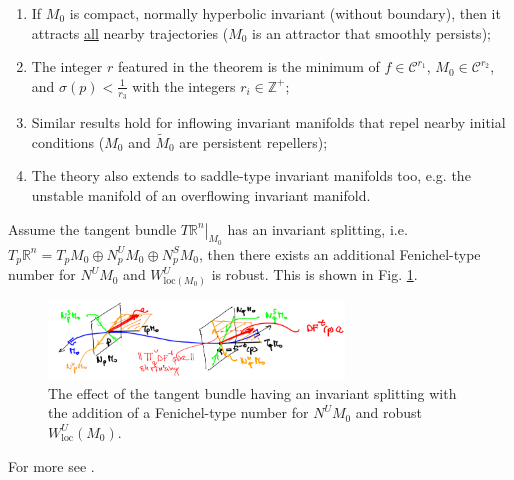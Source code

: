 \begin{remark}[]
	\begin{enumerate}
		\item If $M_0$ is compact, normally hyperbolic invariant (without boundary), then it attracts \underline{all} nearby trajectories ($M_0$ is an attractor that smoothly persists);
		\item The integer $r$ featured in the theorem is the minimum of $f \in \mathcal{C}^{r_1}$, $M_0 \in \mathcal{C}^{r_2}$, and $\sigma(p) < \frac{1}{r_3}$ with the integers $r_i \in \mathbb{Z}^{+}$;
		\item Similar results hold for inflowing invariant manifolds that repel nearby initial conditions ($M_0$ and $\tilde{M}_{0}$ are persistent repellers);
		\item The theory also extends to saddle-type invariant manifolds too, e.g. the unstable manifold of an overflowing invariant manifold.
	\end{enumerate}
	Assume the tangent bundle $\left.T\mathbb{R}^{n}\right|_{M_0}$ has an invariant splitting, i.e. $T_{p}\mathbb{R}^{n} = T_pM_0 \oplus N_{p}^{U}M_0 \oplus N_{p}^{S}M_0$, then there exists an additional Fenichel-type number for $N^{U}M_0$ and $W^{U}_{ \textrm{loc} (M_0)}$ is robust. This is shown in Fig. \ref{fig:fenichel_thm_rmks}.
		\begin{figure}[h!]
			\centering
			\includegraphics[width=0.7\textwidth]{figures/ch9/16fenichel_thm_rmks.png}
			\caption{The effect of the tangent bundle having an invariant splitting with the addition of a Fenichel-type number for $N^{U}M_0$ and robust $W^{U}_{ \textrm{loc} }(M_0)$.}
			\label{fig:fenichel_thm_rmks}
		\end{figure}
\end{remark}
For more see \cite{Wiggins1994}.

